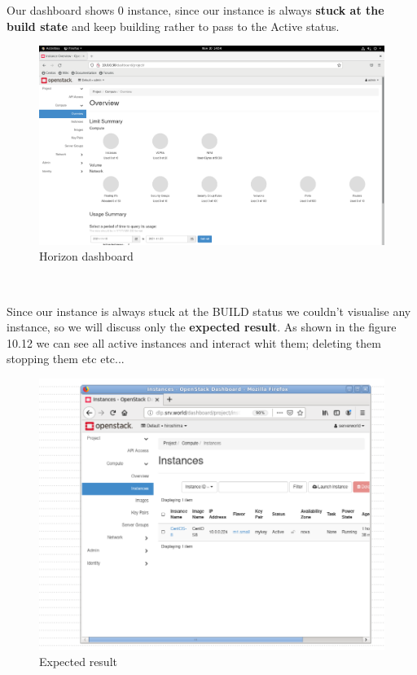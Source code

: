 \begin{spacing}{1.2}
\par Our dashboard shows 0 instance, since our instance is always \textbf{stuck at the build state} and keep building rather to pass to the Active status.
\\
\begin{figure}[!htb] 
\begin{center} 
\includegraphics[width=1\linewidth]{Cloud/Configure Horizon/C_8.png} 
\end{center} 
\caption{  Horizon dashboard} 
\end{figure} 
\FloatBarrier
\\

\par Since our instance is always stuck at the BUILD status we couldn't visualise any instance, so we will discuss only the \textbf{expected result}. As shown in the figure 10.12 we can see all active instances and interact whit them; deleting them stopping them etc etc...
\\
\begin{figure}[!htb] 
\begin{center} 
\includegraphics[width=1\linewidth]{Cloud/Configure Horizon/C_9_expected_results.png} 
\end{center} 
\caption{  Expected result} 
\end{figure} 
\FloatBarrier


\end{spacing}
